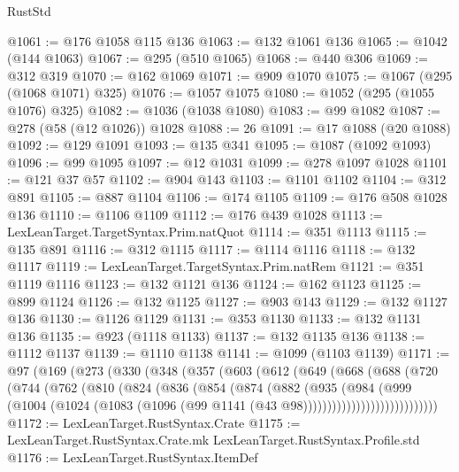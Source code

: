 \begin{lexlean}{RustStd}
\begin{coremodule}
@1061 := @176 @1058 @115 @136
@1063 := @132 @1061 @136
@1065 := @1042 (@144 @1063)
@1067 := @295 (@510 @1065)
@1068 := @440 @306
@1069 := @312 @319
@1070 := @162 @1069
@1071 := @909 @1070
@1075 := @1067 (@295 (@1068 @1071) @325)
@1076 := @1057 @1075
@1080 := @1052 (@295 (@1055 @1076) @325)
@1082 := @1036 (@1038 @1080)
@1083 := @99 @1082
@1087 := @278 (@58 (@12 @1026)) @1028
@1088 := 26
@1091 := @17 @1088 (@20 @1088)
@1092 := @129 @1091
@1093 := @135 @341
@1095 := @1087 (@1092 @1093)
@1096 := @99 @1095
@1097 := @12 @1031
@1099 := @278 @1097 @1028
@1101 := @121 @37 @57
@1102 := @904 @143
@1103 := @1101 @1102
@1104 := @312 @891
@1105 := @887 @1104
@1106 := @174 @1105
@1109 := @176 @508 @1028 @136
@1110 := @1106 @1109
@1112 := @176 @439 @1028
@1113 := LexLeanTarget.TargetSyntax.Prim.natQuot
@1114 := @351 @1113
@1115 := @135 @891
@1116 := @312 @1115
@1117 := @1114 @1116
@1118 := @132 @1117
@1119 := LexLeanTarget.TargetSyntax.Prim.natRem
@1121 := @351 @1119 @1116
@1123 := @132 @1121 @136
@1124 := @162 @1123
@1125 := @899 @1124
@1126 := @132 @1125
@1127 := @903 @143
@1129 := @132 @1127 @136
@1130 := @1126 @1129
@1131 := @353 @1130
@1133 := @132 @1131 @136
@1135 := @923 (@1118 @1133)
@1137 := @132 @1135 @136
@1138 := @1112 @1137
@1139 := @1110 @1138
@1141 := @1099 (@1103 @1139)
@1171 := @97
    (@169
      (@273
        (@330
          (@348
            (@357
              (@603
                (@612
                  (@649
                    (@668
                      (@688
                        (@720
                          (@744
                            (@762
                              (@810
                                (@824
                                  (@836
                                    (@854
                                      (@874
                                        (@882
                                          (@935
                                            (@984
                                              (@999
                                                (@1004
                                                  (@1024
                                                    (@1083
                                                      (@1096
                                                        (@99
                                                          @1141
                                                          (@43 @98))))))))))))))))))))))))))))
@1172 := LexLeanTarget.RustSyntax.Crate
@1175 := LexLeanTarget.RustSyntax.Crate.mk LexLeanTarget.RustSyntax.Profile.std
@1176 := LexLeanTarget.RustSyntax.ItemDef

\end{coremodule}
\end{lexlean}
